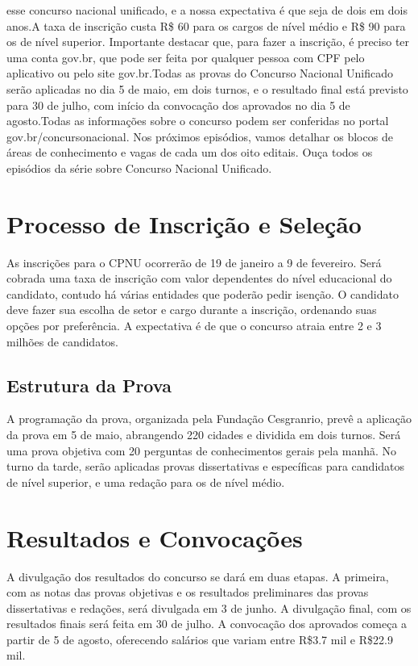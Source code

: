 \documentclass[
   article,       
   12pt,          
   oneside,       
   a4paper,       
   english,       
   brazil,        
   sumario=tradicional
   ]{abntex2}
\begin{document}
esse concurso nacional unificado, e a nossa expectativa é que seja de dois em dois anos.\textquotedbl{}A taxa de inscrição custa R\$ 60 para os cargos de nível médio e R\$ 90 para os de nível superior. Importante destacar que, para fazer a inscrição, é preciso ter uma conta gov.br, que pode ser feita por qualquer pessoa com CPF pelo aplicativo ou pelo site gov.br.Todas as provas do Concurso Nacional Unificado serão aplicadas no dia 5 de maio, em dois turnos, e o resultado final está previsto para 30 de julho, com início da convocação dos aprovados no dia 5 de agosto.Todas as informações sobre o concurso podem ser conferidas no portal gov.br/concursonacional. Nos próximos episódios, vamos detalhar os blocos de áreas de conhecimento e vagas de cada um dos oito editais. Ouça todos os episódios da série sobre Concurso Nacional Unificado.


\section {Processo de Inscrição e Seleção}
As inscrições para o CPNU ocorrerão de 19 de janeiro a 9 de fevereiro. Será cobrada uma taxa de inscrição com valor dependentes do nível educacional do candidato, contudo há várias entidades que poderão pedir isenção. O candidato deve fazer sua escolha de setor e cargo durante a inscrição, ordenando suas opções por preferência. A expectativa é de que o concurso atraia entre 2 e 3 milhões de candidatos.
\subsection {Estrutura da Prova}
A programação da prova, organizada pela Fundação Cesgranrio, prevê a aplicação da prova em 5 de maio, abrangendo 220 cidades e dividida em dois turnos. Será uma prova objetiva com 20 perguntas de conhecimentos gerais pela manhã. No turno da tarde, serão aplicadas provas dissertativas e específicas para candidatos de nível superior, e uma redação para os de nível médio.
\section {Resultados e Convocações}
A divulgação dos resultados do concurso se dará em duas etapas. A primeira, com as notas das provas objetivas e os resultados preliminares das provas dissertativas e redações, será divulgada em 3 de junho. A divulgação final, com os resultados finais será feita em 30 de julho. A convocação dos aprovados começa a partir de 5 de agosto, oferecendo salários que variam entre R\$3.7 mil e R\$22.9 mil.
\end{document}
